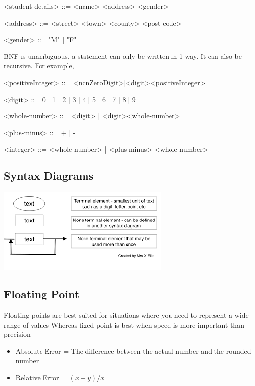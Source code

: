 \documentclass{article}
\begin{document}
\begin{grammar}
<student-details> ::= <name> <address> <gender>

<address> ::= <street> <town> <county> <post-code>

<gender> ::= "M" | "F"
\end{grammar}

BNF is unambiguous, a statement can only be written in 1 way.
It can also be recursive. For example,
\begin{grammar}
<positiveInteger> ::= <nonZeroDigit>|<digit><positiveInteger>
\end{grammar}


\begin{grammar}
<digit> ::= 0 | 1 | 2 | 3 | 4 | 5 | 6 | 7 | 8 | 9

<whole-number> ::= <digit> | <digit><whole-number>

<plus-minus> ::= + | -

<integer> ::= <whole-number> | <plus-minus> <whole-number>
\end{grammar}

\subsection{Syntax Diagrams}
\includegraphics{syntax diagramn.png}

\subsection{Floating Point}
Floating points are best suited for situations where you need to represent a wide range of values
Whereas fixed-point is best when speed is more important than precision

\begin{itemize}
\item Absolute Error = The difference between the actual number and the rounded number
\item Relative Error = $(x - y) / x$
\end{itemize}
\end{document}
